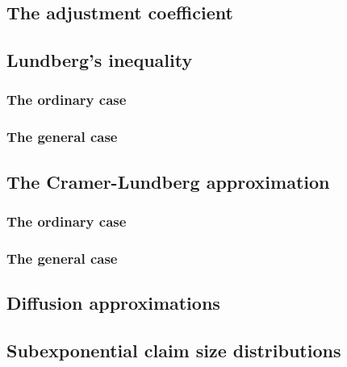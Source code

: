 \documentclass[a4paper,12pt,openany]{book}
\begin{document}
\hypertarget{the-adjustment-coefficient-1}{%
\subsection{The adjustment coefficient}\label{the-adjustment-coefficient-1}}

\hypertarget{lundbergs-inequality-1}{%
\subsection{Lundberg's inequality}\label{lundbergs-inequality-1}}

\hypertarget{the-ordinary-case}{%
\subsubsection{The ordinary case}\label{the-ordinary-case}}

\hypertarget{the-general-case}{%
\subsubsection{The general case}\label{the-general-case}}

\hypertarget{the-cramer-lundberg-approximation-1}{%
\subsection{The Cramer-Lundberg approximation}\label{the-cramer-lundberg-approximation-1}}

\hypertarget{the-ordinary-case-1}{%
\subsubsection{The ordinary case}\label{the-ordinary-case-1}}

\hypertarget{the-general-case-1}{%
\subsubsection{The general case}\label{the-general-case-1}}

\hypertarget{diffusion-approximations-1}{%
\subsection{Diffusion approximations}\label{diffusion-approximations-1}}

\hypertarget{subexponential-claim-size-distributions-1}{%
\subsection{Subexponential claim size distributions}\label{subexponential-claim-size-distributions-1}}
\end{document}

